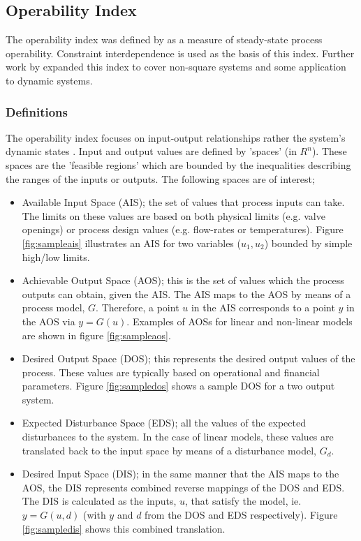 \subsection{Operability Index}\label{sec:oi}
The operability index was defined by \citet{vinsonphd} as a measure of steady-state process operability. 
Constraint interdependence is used as the basis of this index. 
Further work by \citet{limaphd} expanded this index to cover non-square systems and some application to dynamic systems.
\subsubsection{Definitions}
The operability index focuses on input-output relationships rather the system's dynamic states \citep{vinsonphd}. 
Input and output values are defined by 'spaces' (in $R^n$). 
These spaces are the 'feasible regions' which are bounded by the inequalities describing the ranges of the inputs or outputs. 
The following spaces are of interest;
\begin{itemize}
  \item Available Input Space (AIS); the set of values that process      inputs can take. 
    The limits on these values are based on both physical limits (e.g.     valve openings) or process design values (e.g. flow-rates or temperatures). 
Figure \ref{fig:sampleais} illustrates an AIS for two variables ($u_1, u_2$) bounded by simple high/low limits.
  \item Achievable Output Space (AOS); this is the set of values which the process outputs can obtain, given the AIS. 
The AIS maps to the AOS by means of a process model, $G$. 
Therefore, a point $u$ in the AIS corresponds to a point $y$ in the AOS via $y=G(u)$. 
Examples of AOSs for linear and non-linear models are shown in figure \ref{fig:sampleaos}.
  \item Desired Output Space (DOS); this represents the desired output values of the process. 
These values are typically based on operational and financial   parameters. 
Figure \ref{fig:sampledos} shows a sample DOS for a two output    system.
  \item Expected Disturbance Space (EDS); all the values of the expected disturbances to the system. 
In the case of linear models, these values are translated back to the input space by means of a disturbance model, $G_d$.
  \item Desired Input Space (DIS); in the same manner that the AIS maps to the AOS, the DIS represents combined reverse mappings of the DOS and EDS.
The DIS is calculated as the inputs, $u$, that satisfy the model, ie. $y=G(u,d)$ (with $y$ and $d$ from the DOS and EDS respectively).
Figure \ref{fig:sampledis} shows this combined translation.
\end{itemize}

